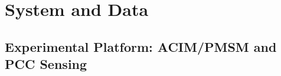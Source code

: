 \documentclass[lettersize,journal]{IEEEtran}
\begin{document}
      
              



\section{System and Data}
\label{sec:system_data}
\subsection{Experimental Platform: ACIM/PMSM and PCC Sensing}
\label{sec:experimental_platform}
\end{document}
